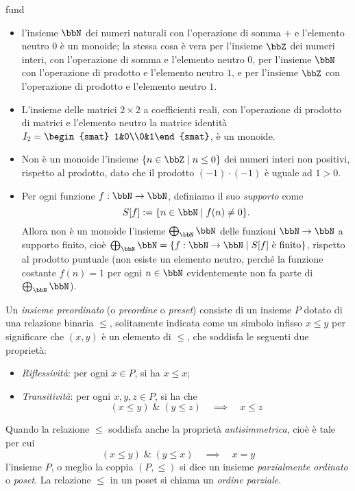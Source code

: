 \begin{hExamples}{fund}\leavevmode
	\begin{itemize}
		\item l'insieme	\(\bbN\) dei numeri naturali con l'operazione di somma \(+\) e l'elemento neutro \(0\) è un monoide; la stessa cosa è vera per l'insieme \(\bbZ\) dei numeri interi, con l'operazione di somma e l'elemento neutro \(0\), per l'insieme \(\bbN\) con l'operazione di prodotto e l'elemento neutro \(1\),	e per l'insieme \(\bbZ\) con l'operazione di prodotto e l'elemento neutro \(1\).
		\item L'insieme delle matrici \(2\times 2\) a coefficienti reali, con l'operazione di prodotto di matrici e l'elemento neutro la matrice identità \(I_2 = \begin{smat} 1&0\\0&1\end{smat}\), è un monoide.
		\item Non è un monoide l'insieme \(\{n\in\bbZ\mid n\le 0\}\) dei numeri interi non positivi, rispetto al prodotto, dato che il prodotto \((-1)\cdot(-1)\) è uguale ad \(1>0\).
		\item Per ogni funzione \(f : \bbN\to\bbN\), definiamo il suo \emph{supporto} come
		      \[S[f] := \{n\in\bbN\mid f(n)\ne 0\}.\]
		      Allora non è un monoide l'insieme \(\bigoplus_\bbN \bbN\) delle funzioni \(\bbN\to\bbN\) a supporto finito, cioè \(\bigoplus_\bbN \bbN=\{f : \bbN\to\bbN\mid S[f] \text{ è finito}\}\), rispetto al prodotto puntuale (non esiste un elemento neutro, perché la funzione costante \(f(n)=1\) per ogni \(n\in\bbN\) evidentemente non fa parte di \(\bigoplus_\bbN \bbN\)).
	\end{itemize}
\end{hExamples}
\begin{definition}\label{prelim_def_preset}
	Un \emph{insieme preordinato} (o \emph{preordine} o \emph{preset}) consiste di un insieme \(P\) dotato di una relazione binaria \(\le\), solitamente indicata come un simbolo infisso \(x\le y\) per significare che \((x,y)\) è un elemento di \(\le\), che soddisfa le seguenti due proprietà:
	\begin{itemize}
		\item \emph{Riflessività}: per ogni \(x\in P\), si ha \(x\le x\);
		\item \emph{Transitività}: per ogni \(x,y,z\in P\), si ha che
		      \[(x\le y)\;\&\;(y\le z) \quad\implies\quad x\le z\]
	\end{itemize}
	Quando la relazione \(\le\) soddisfa anche la proprietà \emph{antisimmetrica}, cioè è tale per cui
	\[(x\le y)\;\&\;(y\le x) \quad\implies\quad x = y\]
	l'insieme \(P\), o meglio la coppia \((P,\le)\) si dice un insieme \emph{parzialmente ordinato} o \emph{poset}. La relazione \(\le\) in un poset si chiama un \emph{ordine parziale}.
\end{definition}
